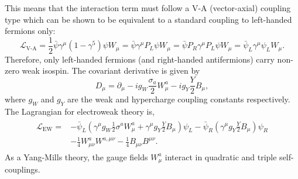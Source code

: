 This means that the interaction term must follow a V-A (vector-axial) coupling type which can be shown to be equivalent to a standard coupling to left-handed fermions only:
\begin{equation}
    \label{eq:v-a_coupling}
    \mathcal{L}_\text{V-A}
    = \frac{1}{2} \bar \psi \gamma^\mu (1 - \gamma^5) \psi W_\mu
    = \bar \psi \gamma^\mu P_L \psi W_\mu
    = \bar \psi P_R \gamma^\mu P_L \psi W_\mu
    = \bar \psi_L \gamma^\mu \psi_L W_\mu.
\end{equation}
Therefore, only left-handed fermions (and right-handed antifermions) carry non-zero weak isospin.
The covariant derivative is given by
\begin{equation}
    \label{eq:ew_covariant_derivative}
    D_\mu = \partial_\mu - i g_W \frac{\sigma_a}{2} W_\mu^a - i g_Y \frac{Y}{2} B_\mu,
\end{equation}
where $g_W$ and $g_Y$ are the weak and hypercharge coupling constants respectively.
The Lagrangian for electroweak theory is,
\begin{align}
    \begin{split}
        \label{eq:ew_lagrangian}
        \mathcal{L}_\text{EW} = & - \bar{\psi}_L \left( \gamma^\mu g_W \frac{1}{2} \sigma^a W^a_\mu + \gamma^\mu g_Y \frac{Y}{2} B_\mu \right) \psi_L - \bar{\psi}_R \left( \gamma^\mu g_Y \frac{Y}{2} B_\mu \right) \psi_R \\
                                & - \frac{1}{4} W_{\mu\nu}^a W^{a,\mu\nu} - \frac{1}{4} B_{\mu\nu} B^{\mu\nu}.
    \end{split}
\end{align}
As a Yang-Mills theory, the gauge fields $W_\mu^a$ interact in quadratic and triple self-couplings.

